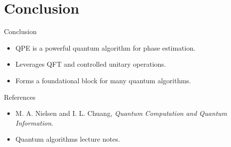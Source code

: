 \documentclass{beamer}
\begin{document}
\section{Conclusion}
\begin{frame}{Conclusion}
    \begin{itemize}
        \item QPE is a powerful quantum algorithm for phase estimation.
        \item Leverages QFT and controlled unitary operations.
        \item Forms a foundational block for many quantum algorithms.
    \end{itemize}
\end{frame}

\begin{frame}{References}
    \begin{itemize}
        \item M. A. Nielsen and I. L. Chuang, \textit{Quantum Computation and Quantum Information}.
        \item Quantum algorithms lecture notes.
    \end{itemize}
\end{frame}
\end{document}
